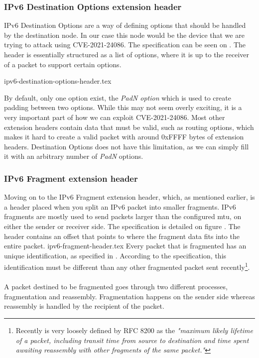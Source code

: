 \documentclass{report}
\begin{document}
\subsubsection{IPv6 Destination Options extension header}
IPv6 Destination Options are a way of defining options that should be handled by the destination node. In our case this node would be the device that we are trying to attack using CVE-2021-24086. The specification can be seen on . The header is essentially structured as a list of options, where it is up to the receiver of a packet to support certain options.

{ipv6-destination-options-header.tex}

By default, only one option exist, the \emph{PadN option}\cite[sec. 4.2]{url:rfc:ipv6} which is used to create padding between two options. While this may not seem overly exciting, it is a very important part of how we can exploit CVE-2021-24086. Most other extension headers contain data that must be valid, such as routing options, which makes it hard to create a valid packet with around 0xFFFF bytes of extension headers. Destination Options does not have this limitation, as we can simply fill it with an arbitrary number of \emph{PadN} options.

\subsubsection{IPv6 Fragment extension header}
Moving on to the IPv6 Fragment extension header, which, as mentioned earlier, is a header placed when you split an IPv6 packet into smaller fragments. IPv6 fragments are mostly used to send packets larger than the configured \gls{mtu}, on either the sender or receiver side. The specification is detailed on figure . The header contains an offset that points to where the fragment data fits into the entire packet.
{ipv6-fragment-header.tex}
Every packet that is fragmented has an unique identification, as specified in . According to the specification\cite[sec. 4.5]{url:rfc:ipv6}, this identification must be different than any other fragmented packet sent recently\footnote{Recently is very loosely defined by RFC 8200\cite{url:rfc:ipv6} as the \emph{"maximum likely lifetime of a packet, including transit time from source to destination and time spent awaiting reassembly with other fragments of the same packet."}\cite[sec. 4.5]{url:rfc:ipv6}}.
\\
\\
A packet destined to be fragmented goes through two different processes, fragmentation and reassembly. Fragmentation happens on the sender side whereas reassembly is handled by the recipient of the packet.
\end{document}
